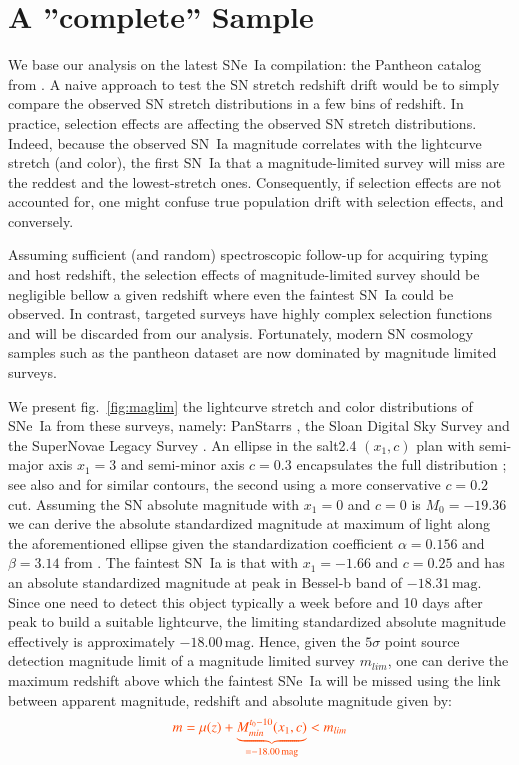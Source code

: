 \documentclass[]{aa} %
\newcommand{\nn}[1]{{\textcolor[rgb]{1, 0.27, 0}{#1}}}
\begin{document}

\section{A ''complete'' Sample}
\label{sec:sample}

We base our analysis on the latest SNe~Ia compilation: the Pantheon catalog from
\cite{scolnic2018a}.  A naive approach to test the SN stretch redshift drift
would be to simply compare the observed SN stretch distributions in a few bins
of redshift.  In practice, selection effects are affecting the observed SN
stretch distributions. Indeed, because the observed SN~Ia magnitude correlates
with the lightcurve stretch (and color), the first SN~Ia that a
magnitude-limited survey will miss are the reddest and the lowest-stretch ones.
Consequently, if selection effects are not accounted for, one might confuse true
population drift with selection effects, and conversely.

\nn{Assuming} sufficient (and random) spectroscopic follow-up for acquiring
typing and host redshift, the selection effects of magnitude-limited survey
should be negligible bellow a given redshift where even the faintest \nn{SN~Ia}
could be observed.  In contrast, targeted surveys have highly complex selection
functions and will be discarded from our analysis. Fortunately, modern SN
cosmology samples such as the pantheon dataset are now dominated by magnitude
limited surveys.

We present fig.~\ref{fig:maglim} the lightcurve stretch and color distributions
of SNe~Ia from these surveys, namely: PanStarrs \citep[PS1][]{rest2014}, the
Sloan Digital Sky Survey \citep[SDSS][]{frieman2008} and the SuperNovae Legacy
Survey \citep[SNLS][]{astier2006}. An ellipse in the salt2.4 $(x_1, c)$ plan
with semi-major axis $x_1=3$ and semi-minor axis $c=0.3$ encapsulates the full
distribution \citep{guy2007,betoule2014}; see also \citet{bazin2011} and
\citet{campbell2013} for similar contours, the second using a more conservative
$c=0.2$ cut. Assuming the SN absolute magnitude with $x_1=0$ and  $c=0$ is
$M_0=-19.36$ \citep{kessler2009,scolnic2014} we can derive the absolute
standardized magnitude at maximum of light along the aforementioned ellipse
given the standardization coefficient $\alpha=0.156$ and $\beta=3.14$ from
\cite{scolnic2018a}. The faintest SN~Ia is that with $x_1=-1.66$ and $c=0.25$
and has an absolute standardized magnitude at peak in Bessel-b band of
$-18.31\,\mathrm{mag}$. Since one need to detect this object typically a week
before and 10 days after peak to build a suitable lightcurve, the limiting
\nn{standardized} absolute magnitude effectively is approximately
$-18.00\,\mathrm{mag}$. Hence, given the $5\sigma$ point source detection
magnitude limit of a magnitude limited survey $m_{lim}$, one can derive the
maximum redshift above which the faintest SNe~Ia will be missed \nn{using the
link between apparent magnitude, redshift and absolute magnitude given by:}
\begin{equation}\label{eq:m_lim}
    \nn{m = \mu(z) + \underbrace{M_{min}^{t_0-10}(x_1, c)}_{=-18.00\,\text{mag}}
    < m_{lim}}
\end{equation}
\end{document}
